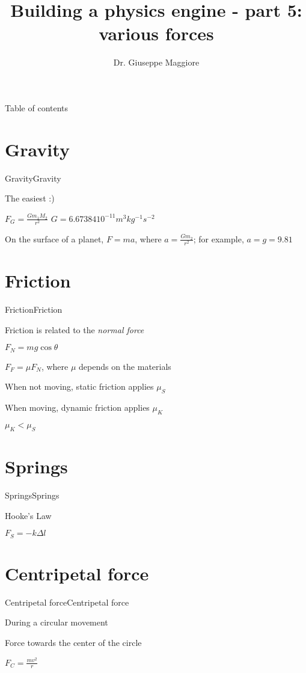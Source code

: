 \documentclass{beamer}
\title{Building a physics engine - part 5: various forces}
\author{Dr. Giuseppe Maggiore}
\institute{NHTV University of Applied Sciences \\ 
Breda, Netherlands}
\date{}
\begin{document}
\maketitle

\begin{frame}{Table of contents}
\tableofcontents
\end{frame}

\section{Gravity}
\begin{slide}{Gravity}{Gravity}{
\item The easiest :)
\item $F_G = \frac{G m_1 M_2}{r^2}$ $G=6.67384 10^{-11} m^3 kg^{-1} s^{-2}$
\item On the surface of a planet, $F=ma$, where $a = \frac{G m_2}{r^2}$; for example, $a = g = 9.81$
}\end{slide}

\section{Friction}
\begin{slide}{Friction}{Friction}{
\item Friction is related to the \textit{normal force}
\item $F_N = m g \cos \theta$
\item $F_F = \mu F_N$, where $\mu$ depends on the materials
\item When not moving, static friction applies $\mu_S$
\item When moving, dynamic friction applies $\mu_K$
\item $\mu_K < \mu_S$
}\end{slide}


\section{Springs}
\begin{slide}{Springs}{Springs}{
\item Hooke's Law
\item $F_S = -k \Delta l$
}\end{slide}


\section{Centripetal force}
\begin{slide}{Centripetal force}{Centripetal force}{
\item During a circular movement
\item Force towards the center of the circle
\item $F_C = \frac{m v^2}{r}$
}\end{slide}
\end{document}
